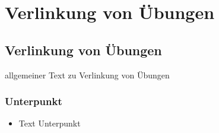 \chapter{Verlinkung von Übungen}\label{linkUebung}
\minitoc
\clearpage
\section{Verlinkung von Übungen}
allgemeiner Text zu Verlinkung von Übungen 

\subsection*{Unterpunkt}
\begin{itemize}
	\item Text Unterpunkt
\end{itemize}

\clearpage